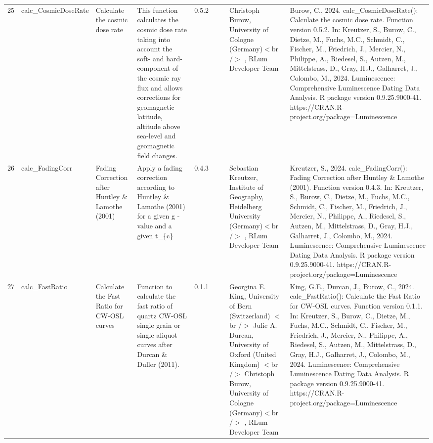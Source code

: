 \begin{table}[ht]
\begin{tabular}{rllllllll}
 \\ 
  25 & calc\_CosmicDoseRate & Calculate the cosmic dose rate & This function calculates the cosmic dose rate taking into account the soft- and hard-component of the cosmic ray flux and allows corrections for geomagnetic latitude, altitude above sea-level and geomagnetic field changes. & 0.5.2
 &  &  & Christoph Burow, University of Cologne (Germany)$<$br /$>$ , RLum Developer Team & Burow, C., 2024. calc\_CosmicDoseRate(): Calculate the cosmic dose rate. Function version 0.5.2. In: Kreutzer, S., Burow, C., Dietze, M., Fuchs, M.C., Schmidt, C., Fischer, M., Friedrich, J., Mercier, N., Philippe, A., Riedesel, S., Autzen, M., Mittelstrass, D., Gray, H.J., Galharret, J., Colombo, M., 2024. Luminescence: Comprehensive Luminescence Dating Data Analysis. R package version 0.9.25.9000-41. https://CRAN.R-project.org/package=Luminescence
 \\ 
  26 & calc\_FadingCorr & Fading Correction after Huntley \& Lamothe (2001) & Apply a fading correction according to Huntley \& Lamothe (2001) for a given g -value and a given  t\_\{c\} & 0.4.3
 &  &  & Sebastian Kreutzer, Institute of Geography, Heidelberg University (Germany)$<$br /$>$ , RLum Developer Team & Kreutzer, S., 2024. calc\_FadingCorr(): Fading Correction after Huntley \& Lamothe (2001). Function version 0.4.3. In: Kreutzer, S., Burow, C., Dietze, M., Fuchs, M.C., Schmidt, C., Fischer, M., Friedrich, J., Mercier, N., Philippe, A., Riedesel, S., Autzen, M., Mittelstrass, D., Gray, H.J., Galharret, J., Colombo, M., 2024. Luminescence: Comprehensive Luminescence Dating Data Analysis. R package version 0.9.25.9000-41. https://CRAN.R-project.org/package=Luminescence
 \\ 
  27 & calc\_FastRatio & Calculate the Fast Ratio for CW-OSL curves & Function to calculate the fast ratio of quartz CW-OSL single grain or single aliquot curves after Durcan \& Duller (2011). & 0.1.1
 &  &  & Georgina E. King, University of Bern (Switzerland)  $<$br /$>$ Julie A. Durcan, University of Oxford (United Kingdom)  $<$br /$>$ Christoph Burow, University of Cologne (Germany)$<$br /$>$ , RLum Developer Team & King, G.E., Durcan, J., Burow, C., 2024. calc\_FastRatio(): Calculate the Fast Ratio for CW-OSL curves. Function version 0.1.1. In: Kreutzer, S., Burow, C., Dietze, M., Fuchs, M.C., Schmidt, C., Fischer, M., Friedrich, J., Mercier, N., Philippe, A., Riedesel, S., Autzen, M., Mittelstrass, D., Gray, H.J., Galharret, J., Colombo, M., 2024. Luminescence: Comprehensive Luminescence Dating Data Analysis. R package version 0.9.25.9000-41. https://CRAN.R-project.org/package=Luminescence

\end{tabular}
\end{table}

